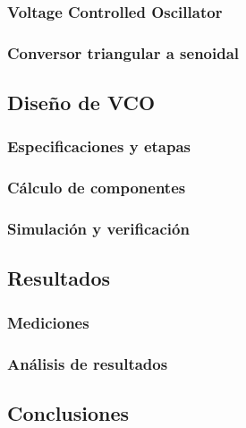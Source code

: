 \subsubsection{Voltage Controlled Oscillator}

\subsubsection{Conversor triangular a senoidal}

\subsection{Dise\~no de VCO}

\subsubsection{Especificaciones y etapas}

\subsubsection{C\'alculo de componentes}

\subsubsection{Simulaci\'on y verificaci\'on}

\subsection{Resultados}

\subsubsection{Mediciones}

\subsubsection{An\'alisis de resultados}

\subsection{Conclusiones}
